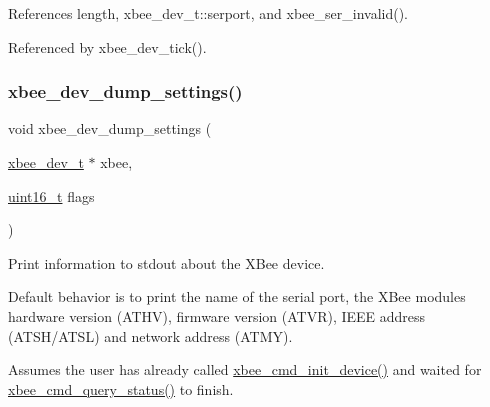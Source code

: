 References length, xbee\+\_\+dev\+\_\+t\+::serport, and xbee\+\_\+ser\+\_\+invalid().



Referenced by xbee\+\_\+dev\+\_\+tick().

\mbox{\label{group__xbee__device_ga96267a6b36d9a1b1d59b16cc60a2b09a}} 
\subsubsection{\texorpdfstring{xbee\+\_\+dev\+\_\+dump\+\_\+settings()}{xbee\_dev\_dump\_settings()}}
{\footnotesize\ttfamily void xbee\+\_\+dev\+\_\+dump\+\_\+settings (\begin{DoxyParamCaption}\item[{\hyperlink{structxbee__dev__t}{xbee\+\_\+dev\+\_\+t} $\ast$}]{xbee,  }\item[{\hyperlink{group__hal__dos_ga5a8b2dc9e45a9ee81a94ef304fb62505}{uint16\+\_\+t}}]{flags }\end{DoxyParamCaption})}



Print information to stdout about the X\+Bee device. 

Default behavior is to print the name of the serial port, the X\+Bee module\textquotesingle{}s hardware version (A\+T\+HV), firmware version (A\+T\+VR), I\+E\+EE address (A\+T\+S\+H/\+A\+T\+SL) and network address (A\+T\+MY).

Assumes the user has already called \hyperlink{group__xbee__atcmd_ga1cc803f821ed44e27e404d38349f53c7}{xbee\+\_\+cmd\+\_\+init\+\_\+device()} and waited for \hyperlink{group__xbee__atcmd_ga83f36dfc3c3cd2c4046719ea6e9cc53c}{xbee\+\_\+cmd\+\_\+query\+\_\+status()} to finish.


